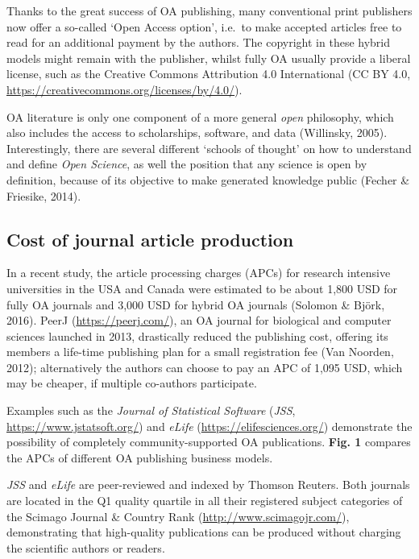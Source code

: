 \documentclass[10pt,fleqn]{wlpeerj}
\begin{document}
Thanks to the great success of OA publishing, many conventional print
publishers now offer a so-called `Open Access option', i.e.~to make
accepted articles free to read for an additional payment by the authors.
The copyright in these hybrid models might remain with the publisher,
whilst fully OA usually provide a liberal license, such as the Creative
Commons Attribution 4.0 International (CC BY 4.0,
\url{https://creativecommons.org/licenses/by/4.0/}).

OA literature is only one component of a more general \emph{open}
philosophy, which also includes the access to scholarships, software,
and data (Willinsky, 2005). Interestingly, there are several different
`schools of thought' on how to understand and define \emph{Open
Science}, as well the position that any science is open by definition,
because of its objective to make generated knowledge public (Fecher \&
Friesike, 2014).

\subsection{Cost of journal article
production}\label{cost-of-journal-article-production}

In a recent study, the article processing charges (APCs) for research
intensive universities in the USA and Canada were estimated to be about
1,800 USD for fully OA journals and 3,000 USD for hybrid OA journals
(Solomon \& Björk, 2016). PeerJ (\url{https://peerj.com/}), an OA
journal for biological and computer sciences launched in 2013,
drastically reduced the publishing cost, offering its members a
life-time publishing plan for a small registration fee (Van Noorden,
2012); alternatively the authors can choose to pay an APC of 1,095 USD,
which may be cheaper, if multiple co-authors participate.

Examples such as the \emph{Journal of Statistical Software} (\emph{JSS},
\url{https://www.jstatsoft.org/}) and \emph{eLife}
(\url{https://elifesciences.org/}) demonstrate the possibility of
completely community-supported OA publications. \textbf{Fig. 1} compares
the APCs of different OA publishing business models.

\emph{JSS} and \emph{eLife} are peer-reviewed and indexed by Thomson
Reuters. Both journals are located in the Q1 quality quartile in all
their registered subject categories of the Scimago Journal \& Country
Rank (\url{http://www.scimagojr.com/}), demonstrating that high-quality
publications can be produced without charging the scientific authors or
readers.
\end{document}
